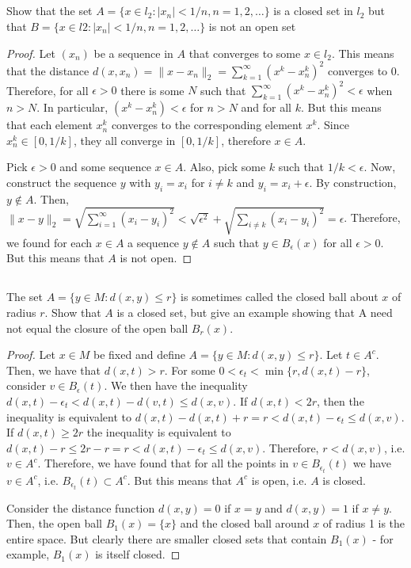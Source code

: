 \subsection{} Show that the set $A = \{x \in l_2 : |x_n| < 1/n, n  = 1, 2, \dots \}$ is  a closed set in $l_2$  but that $B = \{x \in l2 : |x_n| < 1/n, n = 1, 2, \dots \}$ is not an open set

\begin{proof}
Let $(x_n)$ be a sequence in $A$ that converges to some $x \in l_2$. This means that the distance $d(x, x_n) = \|x - x_n\|_2 = \sum_{k=1}^\infty (x^k - x_n^k)^2$ converges to 0. Therefore, for all $\epsilon > 0$ there is some $N$ such that $\sum_{k=1}^\infty (x^k - x_n^k)^2 < \epsilon$ when $n > N$. In particular, $(x^k - x_n^k) < \epsilon$ for $n > N$ and for all $k$. But this means that each element $x_n^k$ converges to the corresponding element $x^k$. Since $x_n^k \in [0, 1/k]$, they all converge in $[0, 1/k]$, therefore $x \in A$.

Pick $\epsilon > 0$ and some sequence $x \in A$. Also, pick some $k$ such that $1/k < \epsilon$. Now, construct the sequence $y$ with $y_i = x_i$ for $i \neq k$ and $y_i = x_i + \epsilon$. By construction, $y \notin A$. Then, $\|x - y\|_2 = \sqrt{\sum_{i=1}^\infty (x_i - y_i) ^2} < \sqrt{\epsilon^2} + \sqrt{\sum_{i\neq k} (x_i - y_i) ^2} = \epsilon$. Therefore, we found for each $x \in A$ a sequence $y \notin A$ such that $y \in B_\epsilon(x)$ for all $\epsilon > 0$. But this means that $A$ is not open.

\end{proof}

\subsection{} The set $A= \{y \in M: d(x,y) \leq r\}$ is sometimes called the closed ball about $x$ of radius $r$. Show that $A$ is a closed set, but give an example showing that A need not equal the closure of the open ball $B_r(x)$. 
\begin{proof}
Let $x \in M$ be fixed and define $A= \{y \in M: d(x,y) \leq r\}$. 
Let $t \in A^c$. Then, we have that $d(x,t) > r$. For some $0 < \epsilon_t < \min\{r, d(x,t) - r\}$, consider  $v \in B_\epsilon(t)$. We then have the inequality $d(x,t) - \epsilon_t < d(x,t) - d(v,t)  \leq d(x,v)$. If $d(x,t) < 2r$, then the inequality is equivalent to $d(x,t) - d(x,t) + r = r < d(x,t) - \epsilon_t \leq d(x,v)$. If $d(x,t) \geq 2r$ the inequality is equivalent to $d(x,t) - r \leq 2r - r = r < d(x,t) - \epsilon_t \leq d(x,v)$. Therefore, $r < d(x,v)$, i.e. $v\in A^c$.
Therefore, we have found that for all the points in $v \in B_{\epsilon_t}(t)$ we have $v \in A^c$, i.e. $B_\epsilon_t(t) \subset A^c$. But this means that $A^c$ is open, i.e. $A$ is closed.

Consider the distance function $d(x,y) = 0$ if $x = y$ and $d(x,y) = 1$ if $x \neq y$. Then, the open ball $B_1(x) = \{x\}$ and the closed ball around $x$ of radius 1 is the entire space. But clearly there are smaller closed sets that contain $B_1(x)$ - for example, $B_1(x)$ is itself closed.

\end{proof}

